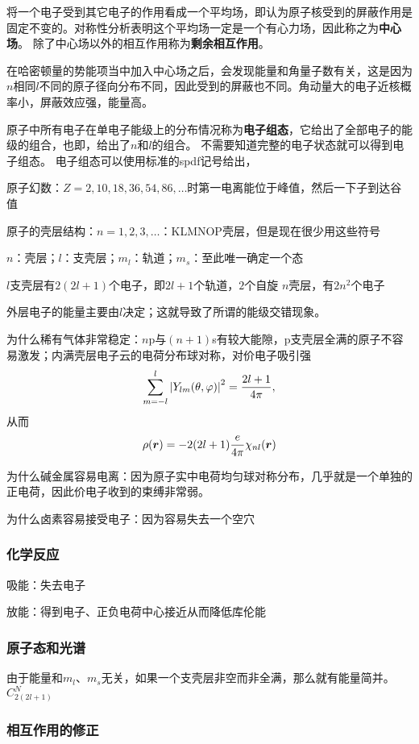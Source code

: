 \documentclass[UTF8, a4paper]{ctexart}
\begin{document}
将一个电子受到其它电子的作用看成一个平均场，即认为原子核受到的屏蔽作用是固定不变的。对称性分析表明这个平均场一定是一个有心力场，因此称之为\textbf{中心场}。
除了中心场以外的相互作用称为\textbf{剩余相互作用}。

在哈密顿量的势能项当中加入中心场之后，会发现能量和角量子数有关，这是因为$n$相同$l$不同的原子径向分布不同，因此受到的屏蔽也不同。角动量大的电子近核概率小，屏蔽效应强，能量高。

原子中所有电子在单电子能级上的分布情况称为\textbf{电子组态}，它给出了全部电子的能级的组合，也即，给出了$n$和$l$的组合。
不需要知道完整的电子状态就可以得到电子组态。
电子组态可以使用标准的spdf记号给出，

原子幻数：$Z=2, 10, 18, 36, 54, 86, \ldots$时第一电离能位于峰值，然后一下子到达谷值

原子的壳层结构：$n=1, 2, 3, \ldots$：KLMNOP壳层，但是现在很少用这些符号

$n$：壳层；$l$：支壳层；$m_l$：轨道；$m_s$：至此唯一确定一个态

$l$支壳层有$2(2l+1)$个电子，即$2l+1$个轨道，$2$个自旋
$n$壳层，有$2n^2$个电子

外层电子的能量主要由$l$决定；这就导致了所谓的能级交错现象。

为什么稀有气体非常稳定：$n$p与$(n+1)$s有较大能隙，p支壳层全满的原子不容易激发；内满壳层电子云的电荷分布球对称，对价电子吸引强
\[
    \sum_{m=-l}^l \abs{Y_{lm}(\theta, \varphi)}^2 = \frac{2l+1}{4\pi},
\]
从而
\[
    \rho(\vb*{r}) = -2(2l+1) \frac{e}{4\pi} \chi_{nl}(\vb*{r})
\]

为什么碱金属容易电离：因为原子实中电荷均匀球对称分布，几乎就是一个单独的正电荷，因此价电子收到的束缚非常弱。

为什么卤素容易接受电子：因为容易失去一个空穴

\subsubsection{化学反应}

吸能：失去电子

放能：得到电子、正负电荷中心接近从而降低库伦能

\subsubsection{原子态和光谱}

由于能量和$m_l$、$m_s$无关，如果一个支壳层非空而非全满，那么就有能量简并。$C_{2(2l+1)}^N$

\subsubsection{相互作用的修正}
\end{document}
